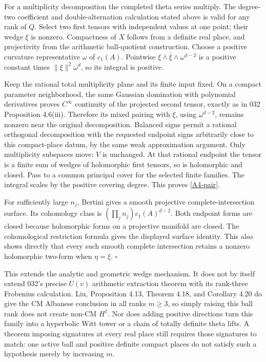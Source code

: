 \documentclass[11pt]{article}
\begin{document}
For a multiplicity decomposition the completed theta series multiply.
The degree-two coefficient and double-alternation calculation stated
above is valid for any rank of $Q$. Select two first tensors with
independent values at one point; their wedge $\xi$ is nonzero.
Compactness of $X$ follows from a definite real place, and projectivity
from the arithmetic ball-quotient construction. Choose a positive
curvature representative $\omega$ of $c_1(A)$. Pointwise
$\xi\wedge\bar\xi\wedge\omega^{d-2}$ is a positive constant
times $\|\xi\|^2\omega^d$, so its integral is positive.

Keep the rational total multiplicity plane and its finite input fixed.
On a compact parameter neighborhood, the same Gaussian domination
with polynomial derivatives proves $C^\infty$ continuity of the
projected second tensor, exactly as in 032 Proposition 4.6(iii).
Therefore its mixed pairing with $\xi$, using $\omega^{d-2}$, remains
nonzero near the original decomposition. Balanced signs permit a
rational orthogonal decomposition with the requested endpoint signs
arbitrarily close to this compact-place datum, by the same weak
approximation argument. Only multiplicity subspaces move; $V$ is
unchanged. At that rational endpoint the tensor is a finite sum of
wedges of holomorphic first tensors, so is holomorphic and closed.
Pass to a common principal cover for the selected finite families.
The integral scales by the positive covering degree. This proves
\eqref{A4-pair}.

For sufficiently large $n_j$, Bertini gives a smooth projective
complete-intersection surface. Its cohomology class is
$(\prod_jn_j)c_1(A)^{d-2}$. Both endpoint forms are closed because
holomorphic forms on a projective manifold are closed. The
cohomological restriction formula gives the displayed surface
identity. This also shows directly that every such smooth complete
intersection retains a nonzero holomorphic two-form when $\eta=\xi$.
$\square$

This extends the analytic and geometric wedge mechanism. It does not
by itself extend 032's precise $U(v)$ arithmetic extraction theorem
with its rank-three Frobenius calculation. Liu, Proposition 4.13,
Theorem 4.18, and Corollary 4.20 do give the CM Albanese conclusion in
all ranks $m\geq3$, so simply raising this ball rank does not create
non-CM $H^1$. Nor does adding positive directions turn this family
into a hyperbolic Witt tower or a chain of totally definite theta
lifts. A theorem imposing signatures at every real place still
requires those signatures to match: one active ball and positive
definite compact places do not satisfy such a hypothesis merely by
increasing $m$.
\end{document}

